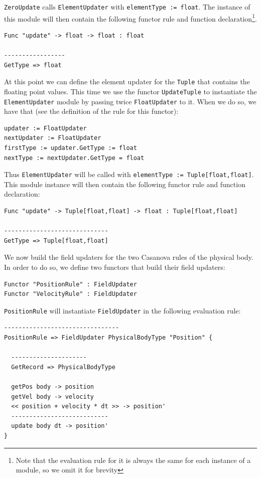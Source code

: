 \noindent
\texttt{ZeroUpdate} calls \texttt{ElementUpdater} with \texttt{elementType := float}. The instance of this module will then contain the following functor rule and function declaration\footnote{Note that the evaluation rule for it is always the same for each instance of a module, so we omit it for brevity}.

\begin{lstlisting}
Func "update" -> float -> float : float

-----------------
GetType => float
\end{lstlisting}

\noindent
At this point we can define the element updater for the \texttt{Tuple} that contains the floating point values. This time we use the functor \texttt{UpdateTuple} to instantiate the \texttt{ElementUpdater} module by passing twice \texttt{FloatUpdater} to it. When we do so, we have that (see the definition of the rule for this functor):

\begin{lstlisting}
updater := FloatUpdater
nextUpdater := FloatUpdater
firstType := updater.GetType := float
nextType := nextUpdater.GetType = float
\end{lstlisting}

\noindent
Thus \texttt{ElementUpdater} will be called with \texttt{elementType := Tuple[float,float]}. This module instance will then contain the following functor rule and function declaration:

\begin{lstlisting}
Func "update" -> Tuple[float,float] -> float : Tuple[float,float]

-----------------------------
GetType => Tuple[float,float]
\end{lstlisting}

\noindent
We now build the field updaters for the two Casanova rules of the physical body. In order to do so, we define two functors that build their field updaters:

\begin{lstlisting}
Functor "PositionRule" : FieldUpdater
Functor "VelocityRule" : FieldUpdater
\end{lstlisting}

\noindent
\texttt{PositionRule} will instantiate \texttt{FieldUpdater} in the following evaluation rule:

\begin{lstlisting}
--------------------------------
PositionRule => FieldUpdater PhysicalBodyType "Position" {

  ---------------------
  GetRecord => PhysicalBodyType

  getPos body -> position
  getVel body -> velocity
  << position + velocity * dt >> -> position'
  ---------------------------
  update body dt -> position'
}
\end{lstlisting}

